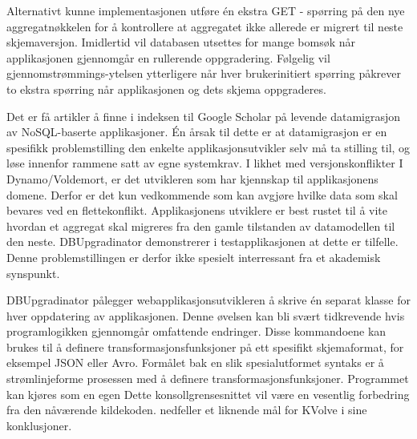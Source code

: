 Alternativt kunne implementasjonen utføre én ekstra GET - spørring på den nye aggregatnøkkelen for å kontrollere at aggregatet ikke allerede er migrert til neste skjemaversjon. Imidlertid vil databasen utsettes for mange bomsøk når applikasjonen gjennomgår en rullerende oppgradering. Følgelig vil gjennomstrømmings-ytelsen ytterligere når hver brukerinitiert spørring påkrever to ekstra spørring når applikasjonen og dets skjema oppgraderes. 

Det er få artikler å finne i indeksen til Google Scholar på levende datamigrasjon av NoSQL-baserte applikasjoner. Én årsak til dette er at datamigrasjon er en spesifikk problemstilling den enkelte applikasjonsutvikler selv må ta stilling til, og løse innenfor rammene satt av egne systemkrav. I likhet med versjonskonflikter I Dynamo/Voldemort, er det utvikleren som har kjennskap til applikasjonens domene. Derfor er det kun vedkommende som kan avgjøre hvilke data som skal bevares ved en flettekonflikt. Applikasjonens utviklere er best rustet til å vite hvordan et aggregat skal migreres fra den gamle tilstanden av datamodellen til den neste. DBUpgradinator demonstrerer i testapplikasjonen at dette er tilfelle. Denne problemstillingen er derfor ikke spesielt interressant fra et akademisk synspunkt.

DBUpgradinator pålegger webapplikasjonsutvikleren å skrive én separat klasse for hver oppdatering av applikasjonen. Denne øvelsen kan bli svært tidkrevende hvis programlogikken gjennomgår omfattende endringer. Disse kommandoene kan brukes til å definere transformasjonsfunksjoner på ett spesifikt skjemaformat, for eksempel JSON eller Avro. Formålet bak en slik spesialutformet syntaks er å strømlinjeforme prosessen med å definere transformasjonsfunksjoner. Programmet kan kjøres som en egen Dette konsollgrensesnittet vil være en vesentlig forbedring fra den nåværende kildekoden. \cite{saur2016} nedfeller et liknende mål for KVolve i sine konklusjoner.

\cleardoublepage


